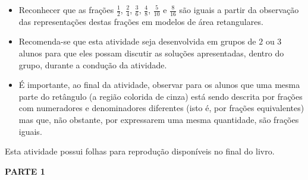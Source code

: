 \begin{multicols}{2}


\begin{objetivos}[label=chap4-ativ6]{}{}
\begin{itemize} %
    \item       Reconhecer que as frações       $\frac{1}{2}$,
$\frac{2}{4}$,       $\frac{3}{6}$,       $\frac{4}{8}$,       $\frac{5}{10}$
   e       $\frac{8}{16}$       são iguais a partir da observação das
representações destas frações em modelos de área retangulares.
\end{itemize} %


\end{objetivos}

\begin{orientacoes}{}{}
\begin{itemize} %
    \item       Recomenda-se que esta atividade seja desenvolvida em grupos de
    $2$       ou       $3$       alunos para que eles possam discutir as
soluções apresentadas, dentro do grupo, durante a condução da atividade.
    \item       É importante, ao final da atividade, observar para os alunos que
uma mesma parte do retângulo (a região colorida de cinza) está sendo descrita
por frações com numeradores e denominadores diferentes (isto é, por frações
equivalentes) mas que, não obstante, por expressarem uma mesma quantidade, são
frações iguais.
\end{itemize} %


  Esta atividade possui     folhas para reprodução disponíveis no final do
livro.



\end{orientacoes}

 \vspace*{\fill}
\columnbreak

\begin{solucao}{}{}
  {\bf PARTE 1}
\end{solucao}


\end{multicols}
